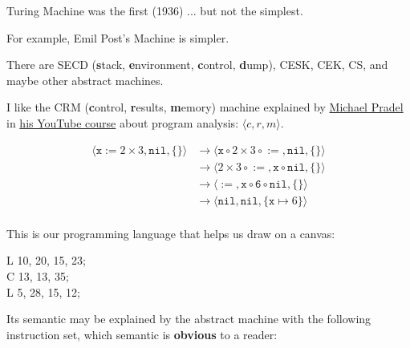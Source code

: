 \documentclass{article}
\begin{document}
\plush{}


Turing Machine was the first (1936) ... but not the simplest.


For example, Emil Post's Machine is simpler.

\plush{}



There are SECD (\textbf{s}tack, \textbf{e}nvironment, \textbf{c}ontrol, \textbf{d}ump),
CESK, CEK, CS, and maybe other abstract machines.

I like the CRM (\textbf{c}ontrol, \textbf{r}esults, \textbf{m}emory) machine explained by
\href{https://software-lab.org/people/Michael_Pradel.html}{Michael Pradel} in
\href{https://www.youtube.com/watch?v=YRfb2zDk_qs}{his YouTube course} about program analysis:
$\langle c, r, m\rangle$.

\begin{equation*}
\begin{split}
\langle \texttt{x} \mathrel{\texttt{:=}} 2 \times 3, \texttt{nil}, \{\} \rangle
  & \longrightarrow \langle \texttt{x} \mathrel{\circ} 2 \times 3 \mathrel{\circ} \mathrel{\texttt{:=}}, \texttt{nil}, \{ \}\rangle \\
  & \longrightarrow \langle 2 \times 3 \mathrel{\circ} \mathrel{\texttt{:=}}, \texttt{x} \mathrel{\circ} \texttt{nil}, \{ \}\rangle \\
  & \longrightarrow \langle \mathrel{\texttt{:=}}, \texttt{x} \mathrel{\circ} \texttt{6} \mathrel{\circ} \texttt{nil}, \{ \}\rangle \\
  & \longrightarrow \langle \texttt{nil}, \texttt{nil}, \{ \texttt{x} \mapsto 6 \}\rangle \\
\end{split}
\end{equation*}

\plush{}


This is our programming language that helps us draw on a canvas:

\begin{multicols}{2}
{\ttfamily
L 10, 20, 15, 23; \\
C 13, 13, 35; \\
L 5, 28, 15, 12;}

Its semantic may be explained by the abstract machine with the following instruction set, which semantic is \textbf{obvious} to a reader:
\par\columnbreak\par
{}
\end{multicols}
\end{document}
